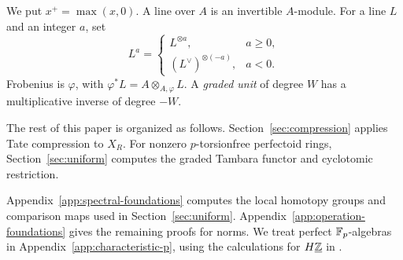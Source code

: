 We put $x^+=\max(x,0)$. A line over $A$ is an invertible $A$-module.
For a line $L$ and an integer $a$, set
\[
L^a=\begin{cases}L^{\otimes a},&a\ge0,\\
(L^\vee)^{\otimes(-a)},&a<0.
\end{cases}
\]
Frobenius is $\varphi$, with $\varphi^*L=A\otimes_{A,\varphi}L$.
A \emph{graded unit} of degree $W$ has a multiplicative inverse of degree $-W$.


The rest of this paper is organized as follows.
Section~\ref{sec:compression} applies Tate compression to $X_R$.
For nonzero $p$-torsionfree perfectoid rings, Section~\ref{sec:uniform}
computes the graded Tambara functor and cyclotomic restriction.

Appendix~\ref{app:spectral-foundations} computes the local homotopy
groups and comparison maps used in Section~\ref{sec:uniform}.
Appendix~\ref{app:operation-foundations} gives the remaining
proofs for norms.
We treat perfect $\mathbb F_p$-algebras in Appendix~\ref{app:characteristic-p},
using the calculations for $H\underline{\mathbb Z}$ in \cite{ZhangHZ}.
